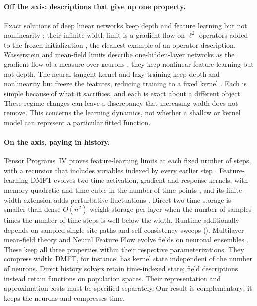 \documentclass[11pt]{article}
\theoremstyle{definition}
\theoremstyle{remark}
\begin{document}
\paragraph{Off the axis: descriptions that give up one property.}
Exact solutions of deep linear networks keep depth and feature learning but not
nonlinearity \citep{saxe2014exact}; their infinite-width limit is a gradient
flow on $\ell^2$ operators added to the frozen initialization
\citep{chizat2024linear}, the cleanest example of an operator description.
Wasserstein and mean-field limits describe one-hidden-layer networks as the
gradient flow of a measure over neurons
\citep{chizat2018global,mei2018meanfield,sirignano2019lln}; they keep nonlinear
feature learning but not depth.  The neural tangent kernel and lazy training
keep depth and nonlinearity but freeze the features, reducing training to a
fixed kernel \citep{jacot2018ntk,lee2019wide,chizat2019lazy}.  Each is simple
because of what it sacrifices, and each is exact about a different object.
These regime changes can leave a discrepancy that increasing width does not
remove.  This concerns the learning dynamics, not whether a shallow or kernel
model can represent a particular fitted function.

\paragraph{On the axis, paying in history.}
Tensor Programs~IV proves feature-learning limits at each fixed number of steps,
with a recursion that includes variables indexed by every earlier step
\citep{yang2021tensor}.  Feature-learning DMFT evolves two-time activation,
gradient and response kernels, with memory quadratic and time cubic in the
number of time points \citep{bordelon2022dmft}, and its finite-width extension
adds perturbative fluctuations \citep{bordelon2023finite}.  Direct two-time
storage is smaller than dense $O(n^2)$ weight storage per layer when the
number of samples times the number of time steps is well below the width.  Runtime additionally depends on sampled
single-site paths and self-consistency sweeps ().
Multilayer mean-field theory and Neural Feature Flow evolve fields on neuronal
ensembles \citep{nguyen2023rigorous,fang2020features}.  These keep all three
properties within their respective parameterizations.  They compress width: DMFT, for
instance, has kernel state independent of the number of neurons.  Direct
history solvers retain time-indexed state; field descriptions instead retain
functions on population spaces.  Their representation and approximation
costs must be specified separately.
Our result is complementary: it keeps the neurons and compresses time.
\end{document}
